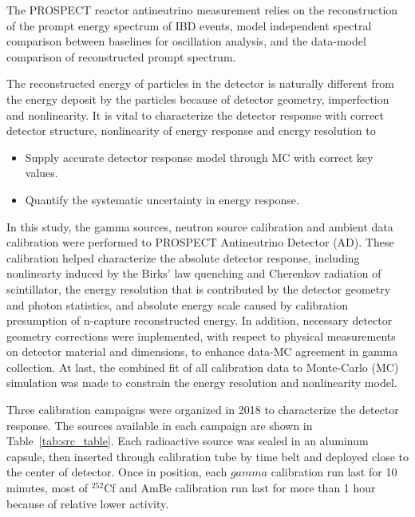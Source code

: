 \label{Ch6}

\label{sec:intro}
The PROSPECT reactor antineutrino measurement relies on the reconstruction of the prompt energy spectrum of IBD events, model independent spectral comparison between baselines for oscillation analysis, and the data-model comparison of reconstructed prompt spectrum.

The reconstructed energy of particles in the detector is naturally different from the energy deposit by the particles because of detector geometry, imperfection and nonlinearity. 
It is vital to characterize the detector response with correct detector structure, nonlinearity of energy response and energy resolution to
\begin{itemize}
    \item Supply accurate detector response model through MC with correct key values.
    \item Quantify the systematic uncertainty in energy response. 
\end{itemize}

In this study, the gamma sources, neutron source calibration and ambient data calibration were performed to PROSPECT Antineutrino Detector (AD). 
These calibration helped characterize the absolute detector response, including nonlinearty induced by the Birks' law quenching and Cherenkov radiation of scintillator, the energy resolution that is contributed by the detector geometry and photon statistics, and absolute energy scale caused by calibration presumption of n-capture reconstructed energy. 
In addition, necessary detector geometry corrections were implemented, with respect to physical measurements on detector material and dimensions, to enhance data-MC agreement in gamma collection.
At last, the combined fit of all calibration data to Monte-Carlo (MC) simulation was made to constrain  the energy resolution and nonlinearity model.


Three calibration campaigns were organized in 2018 to characterize the detector response.
The sources available in each campaign are shown in Table~\ref{tab:src_table}.
Each radioactive source was sealed in an aluminum capsule, then inserted through calibration tube by time belt and deployed close to the center of detector.
Once in position, each $gamma$ calibration run last for 10 minutes, most of $^{252}$Cf and AmBe calibration run last for more than 1 hour because of relative lower activity.

